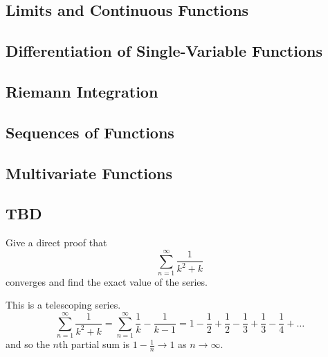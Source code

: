 \subsection{Limits and Continuous Functions}

\subsection{Differentiation of Single-Variable Functions}

\subsection{Riemann Integration} 

\subsection{Sequences of Functions} 

\subsection{Multivariate Functions} 

\subsection{TBD} 

  \begin{exercise}
    Give a direct proof that
    \begin{equation}
      \sum_{n=1}^{\infty} \frac{1}{k^2+k}
    \end{equation}
    converges and find the exact value of the series.
  \end{exercise}
  \begin{solution}
    This is a telescoping series. 
    \begin{equation}
      \sum_{n=1}^\infty \frac{1}{k^2 + k} = \sum_{n=1}^\infty \frac{1}{k} - \frac{1}{k-1} = 1 - \frac{1}{2} + \frac{1}{2} - \frac{1}{3} + \frac{1}{3} - \frac{1}{4} + \ldots 
    \end{equation}
    and so the $n$th partial sum is $1 - \frac{1}{n} \to 1$ as $n \to \infty$. 
  \end{solution}

